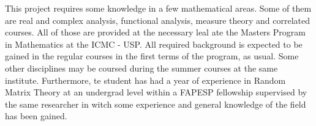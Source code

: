 This project requires some knowledge in a few mathematical areas. Some of them are real and complex analysis, functional analysis, measure theory and correlated courses. All of those are provided at the necessary leal ate the Masters Program in Mathematics at the ICMC - USP. All required background is expected to be gained in the regular courses in the first terms of the program, as usual. Some other disciplines may be coursed during the summer courses at the same institute. Furthermore, te student has had a year of experience in Random Matrix Theory at an undergrad level within a FAPESP fellowship supervised by the same researcher in witch some experience and general knowledge of the field has been gained.
